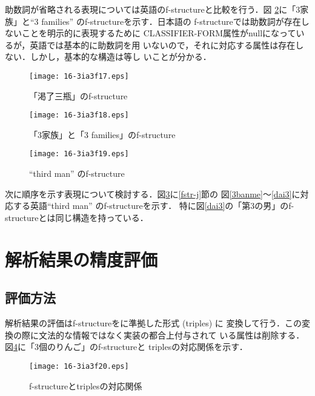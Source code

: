 \documentclass[japanese]{jnlp_1.4}
\newcommand{\KetujiX}[1]{}
\begin{document}
助数詞が省略される表現については英語のf-structureと比較を行う．図
\ref{3families}に「3家族」と``3 families'' のf-structureを示す．日本語の
f-structureでは助数詞が存在しないことを明示的に表現するために
CLASSIFIER-FORM属性がnullになっているが，英語では基本的に助数詞を用
いないので，それに対応する属性は存在しない．しかし，基本的な構造は等し
いことが分かる．

\begin{figure}[t]
\begin{center}
\texttt{[image: 16-3ia3f17.eps]}
\end{center}
\caption{「\protect\KetujiX{16-3ia3f00.eps}渇了三瓶」のf-structure}
\label{3bin-2-c}
\end{figure}
\begin{figure}[t]
\begin{center}
\texttt{[image: 16-3ia3f18.eps]}
\end{center}
\caption{「3家族」と「3 families」のf-structure}
\label{3families}
\end{figure}
\begin{figure}[t]
\begin{center}
\texttt{[image: 16-3ia3f19.eps]}
\end{center}
\caption{``third man'' のf-structure}
\label{3rd-man}
\end{figure}


次に順序を示す表現について検討する．図\ref{3rd-man}に\ref{fstr-j}節の
図\ref{3banme}〜\ref{dai3}に対応する英語``third man'' のf-structureを示す．
特に図\ref{dai3}の「第3の男」のf-structureとは同じ構造を持っている．


\section{\label{hyouka}解析結果の精度評価}

\subsection{評価方法}

解析結果の評価はf-structureを\cite{triples}に準拠した形式 (triples) に
変換して行う．この変換の際に文法的な情報ではなく実装の都合上付与されて
いる属性は削除する．図\ref{triples}に「3個のりんご」のf-structureと
triplesの対応関係を示す．

\begin{figure}[b]
\begin{center}
\texttt{[image: 16-3ia3f20.eps]}
\end{center}
\caption{f-structureとtriplesの対応関係}
\label{triples}
\end{figure}
\end{document}
